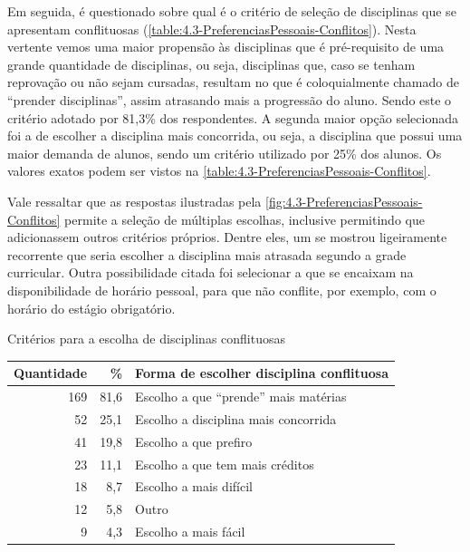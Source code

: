 \begin{apendicesenv}
  Em seguida, é questionado sobre qual é o critério de seleção de disciplinas que se apresentam conflituosas (\autoref{table:4.3-PreferenciasPessoais-Conflitos}). Nesta vertente vemos uma maior propensão às disciplinas que é pré-requisito de uma grande quantidade de disciplinas, ou seja, disciplinas que, caso se tenham reprovação ou não sejam cursadas, resultam no que é coloquialmente chamado de ``prender disciplinas'', assim atrasando mais a progressão do aluno. Sendo este o critério adotado por 81,3\% dos respondentes. A segunda maior opção selecionada foi a de escolher a disciplina mais concorrida, ou seja, a disciplina que possui uma maior demanda de alunos, sendo um critério utilizado por 25\% dos alunos. Os valores exatos podem ser vistos na \autoref{table:4.3-PreferenciasPessoais-Conflitos}.


  Vale ressaltar que as respostas ilustradas pela \autoref{fig:4.3-PreferenciasPessoais-Conflitos} permite a seleção de múltiplas escolhas, inclusive permitindo que adicionassem outros critérios próprios. Dentre eles, um se mostrou ligeiramente recorrente que seria escolher a disciplina mais atrasada segundo a grade curricular. Outra possibilidade citada foi selecionar a que se encaixam na disponibilidade de horário pessoal, para que não conflite, por exemplo, com o horário do estágio obrigatório.

  \begin{CenteredTable} \caption{Critérios para a escolha de disciplinas conflituosas} \label{table:4.3-PreferenciasPessoais-Conflitos}
    \begin{tabular}{| r r l |}
      \hline
      \textbf{Quantidade} & \%   & \textbf{Forma de escolher disciplina conflituosa} \\
      \hline
      169                 & 81,6 & Escolho a que ``prende'' mais matérias            \\
      52                  & 25,1 & Escolho a disciplina mais concorrida              \\
      41                  & 19,8 & Escolho a que prefiro                             \\
      23                  & 11,1 & Escolho a que tem mais créditos                   \\
      18                  & 8,7  & Escolho a mais difícil                            \\
      12                  & 5,8  & Outro                                             \\
      9                   & 4,3  & Escolho a mais fácil                              \\
      \hline
    \end{tabular}
  \end{CenteredTable}


\end{apendicesenv}
